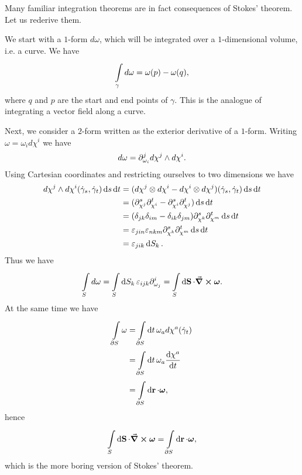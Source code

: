 Many familiar integration theorems are in fact consequences of Stokes' theorem. Let us rederive them.

We start with a $1$-form $d\omega$, which will be integrated over a $1$-dimensional volume, i.e. a curve. We have
\begin{align*}
	\int\limits_{\gamma}^{}d\omega = \omega(p) - \omega(q),
\end{align*}
where $q$ and $p$ are the start and end points of $\gamma$. This is the analogue of integrating a vector field along a curve.

Next, we consider a $2$-form written as the exterior derivative of a $1$-form. Writing $\omega = \omega_{i}d\chi^{i}$ we have
\begin{align*}
d\omega = \partial^{j}_{\omega_{i}}d\chi^{j}\wedge d\chi^{i}.
\end{align*}
Using Cartesian coordinates and restricting ourselves to two dimensions we have
\begin{align*}
	d\chi^{j}\wedge d\chi^{i}(\dot{\gamma}_{s}, \dot{\gamma}_{t})\dd{s}\dd{t} &= (d\chi^{j}\otimes d\chi^{i} - d\chi^{i}\otimes d\chi^{j})(\dot{\gamma}_{s}, \dot{\gamma}_{t})\dd{s}\dd{t} \\
	                                                                                 &= (\partial^{s}_{\chi^{j}}\partial^{t}_{\chi^{i}} - \partial^{s}_{\chi^{i}}\partial^{t}_{\chi^{j}})\dd{s}\dd{t} \\
	                                                                                 &= (\delta_{jk}\delta_{im} - \delta_{ik}\delta_{jm})\partial^{s}_{\chi^{k}}\partial^{t}_{\chi^{m}}\dd{s}\dd{t} \\
	                                                                                 &= \varepsilon_{jin}\varepsilon_{nkm}\partial^{s}_{\chi^{k}}\partial^{t}_{\chi^{m}}\dd{s}\dd{t} \\
	                                                                                 &= \varepsilon_{jik}\dd{S_{k}}.
\end{align*}
Thus we have
\begin{align*}
	\int\limits_{S}^{}d\omega = \int\limits_{S}^{}\dd{S_{k}}{\varepsilon_{ijk}\ensuremath{\partial^{i}_{\omega_{j}}}} = \int\limits_{S}^{}\dd{\vb{S}}{\cdot\curl{\vb*{\omega}}}.
\end{align*}
At the same time we have
\begin{align*}
	\int\limits_{\partial S}^{}{\omega} &= \int\limits_{\partial S}^{}\dd{t}{\omega_{a}\ensuremath{d\chi^{a}}(\dot{\gamma}_{t})} \\
	                           &= \int\limits_{\partial S}^{}\dd{t}{\omega_{a}\dv{\chi^{a}}{t}} \\
	                           &= \int\limits_{\partial S}^{}\dd{\vb{r}}{\cdot\vb*{\omega}},
\end{align*}
hence
\begin{align*}
	\int\limits_{S}^{}\dd{\vb{S}}{\cdot\curl{\vb*{\omega}}} = \int\limits_{\partial S}^{}\dd{\vb{r}}{\cdot\vb*{\omega}},
\end{align*}
which is the more boring version of Stokes' theorem.


